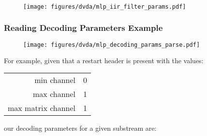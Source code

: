 \begin{figure}[h]
  \centering
  \texttt{[image: figures/dvda/mlp\_iir\_filter\_params.pdf]}
\end{figure}

\clearpage

\subsubsection{Reading Decoding Parameters Example}

\begin{figure}[h]
  \texttt{[image: figures/dvda/mlp\_decoding\_params\_parse.pdf]}
\end{figure}

\clearpage

For example, given that a restart header is present with the values:
\begin{table}[h]
  {
    \begin{tabular}{rl}
      min channel & 0 \\
      max channel & 1 \\
      max matrix channel & 1 \\
    \end{tabular}
  }
\end{table}
\par
\noindent
our decoding parameters for a given substream are:
